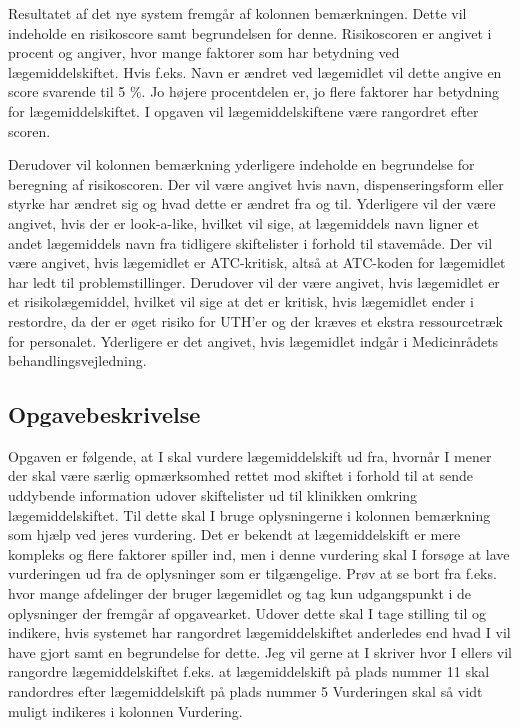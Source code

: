Resultatet af det nye system fremgår af kolonnen bemærkningen. Dette vil indeholde en risikoscore samt begrundelsen for denne. Risikoscoren er angivet i procent og angiver, hvor mange faktorer som har betydning ved lægemiddelskiftet. Hvis f.eks. Navn er ændret ved lægemidlet vil dette angive en score svarende til 5 \%. Jo højere procentdelen er, jo flere faktorer har betydning for lægemiddelskiftet. I opgaven vil lægemiddelskiftene være rangordret efter scoren.  

Derudover vil kolonnen bemærkning yderligere indeholde en begrundelse for beregning af risikoscoren. Der vil være angivet hvis navn, dispenseringsform eller styrke har ændret sig og hvad dette er ændret fra og til. Yderligere vil der være angivet, hvis der er look-a-like, hvilket vil sige, at lægemiddels navn ligner et andet lægemiddels navn fra tidligere skiftelister i forhold til stavemåde. Der vil være angivet, hvis lægemidlet er ATC-kritisk, altså at ATC-koden for lægemidlet har ledt til problemstillinger. Derudover vil der være angivet, hvis lægemidlet er et risikolægemiddel, hvilket vil sige at det er kritisk, hvis lægemidlet ender i restordre, da der er øget risiko for UTH’er og der kræves et ekstra ressourcetræk for personalet. Yderligere er det angivet, hvis lægemidlet indgår i Medicinrådets behandlingsvejledning. 

\subsection{Opgavebeskrivelse}
Opgaven er følgende, at I skal vurdere lægemiddelskift ud fra, hvornår I mener der skal være særlig opmærksomhed rettet mod skiftet i forhold til at sende uddybende information udover skiftelister ud til klinikken omkring lægemiddelskiftet. Til dette skal I bruge oplysningerne i kolonnen bemærkning som hjælp ved jeres vurdering. Det er bekendt at lægemiddelskift er mere kompleks og flere faktorer spiller ind, men i denne vurdering skal I forsøge at lave vurderingen ud fra de oplysninger som er tilgængelige. Prøv at se bort fra f.eks. hvor mange afdelinger der bruger lægemidlet og tag kun udgangspunkt i de oplysninger der fremgår af opgavearket. Udover dette skal I tage stilling til og indikere, hvis systemet har rangordret lægemiddelskiftet anderledes end hvad I vil have gjort samt en begrundelse for dette. Jeg vil gerne at I skriver hvor I ellers vil rangordre lægemiddelskiftet f.eks. at lægemiddelskift på plads nummer 11 skal randordres efter lægemiddelskift på plads nummer 5 Vurderingen skal så vidt muligt indikeres i kolonnen Vurdering.

